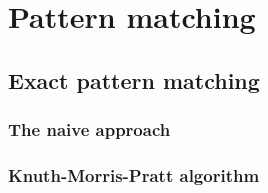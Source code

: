 \documentclass[12pt, letterpaper]{article}
\begin{document}
\section{Pattern matching}

\subsection{Exact pattern matching}

\subsubsection{The naive approach}

\subsubsection{Knuth-Morris-Pratt algorithm}
\end{document}
